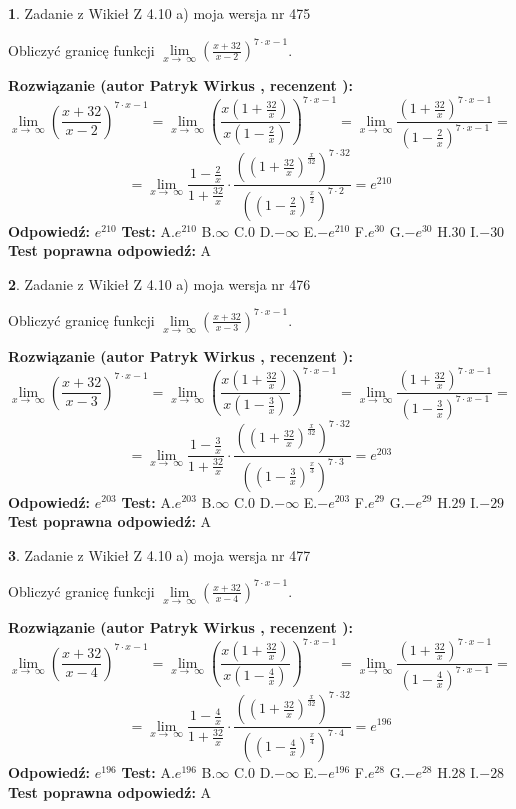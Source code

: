 \documentclass[12pt, a4paper]{article}
\theoremstyle{definition} %
\newtheorem{zad}{}
\newcommand{\zadStart}[1]{\begin{zad}#1\newline}
\newcommand{\zadStop}{\end{zad}}
\newcommand{\rozwStart}[2]{\noindent \textbf{Rozwiązanie (autor #1 , recenzent #2): }\newline}
\newcommand{\rozwStop}{\newline}
\newcommand{\odpStart}{\noindent \textbf{Odpowiedź:}\newline}
\newcommand{\odpStop}{\newline}
\newcommand{\testStart}{\noindent \textbf{Test:}\newline}
\newcommand{\testStop}{\newline}
\newcommand{\kluczStart}{\noindent \textbf{Test poprawna odpowiedź:}\newline}
\newcommand{\kluczStop}{\newline}
\begin{document}
\zadStart{Zadanie z Wikieł Z 4.10 a) moja wersja nr 475}

Obliczyć granicę funkcji  $\lim\limits_{x\to\ \infty}(\frac{x+32}{x-2})^{7\cdot x-1}$.
\zadStop
\rozwStart{Patryk Wirkus}{}
$$\lim\limits_{x\to\ \infty}(\frac{x+32}{x-2})^{7\cdot x-1} = \lim\limits_{x\to\ \infty}(\frac{x(1+\frac{32}{x})}{x(1-\frac{2}{x})})^{7\cdot x-1}=\lim\limits_{x\to\ \infty}\frac{(1+\frac{32}{x})^{7\cdot x-1}}{(1-\frac{2}{x})^{7\cdot x-1}}=$$
$$=\lim\limits_{x\to\ \infty}\frac{1-\frac{2}{x}}{1+\frac{32}{x}}\cdot\frac{((1+\frac{32}{x})^{\frac{x}{32}})^{7\cdot32}}{((1-\frac{2}{x})^{\frac{x}{2}})^{7\cdot2}}=e^{210}$$
\rozwStop
\odpStart
$e^{210}$
\odpStop
\testStart
A.$e^{210}$ B.$\infty$ C.$0$ D.$-\infty$ E.$-e^{210}$
F.$e^{30}$ G.$-e^{30}$
H.$30$
I.$-30$
\testStop
\kluczStart
A
\kluczStop



\zadStart{Zadanie z Wikieł Z 4.10 a) moja wersja nr 476}

Obliczyć granicę funkcji  $\lim\limits_{x\to\ \infty}(\frac{x+32}{x-3})^{7\cdot x-1}$.
\zadStop
\rozwStart{Patryk Wirkus}{}
$$\lim\limits_{x\to\ \infty}(\frac{x+32}{x-3})^{7\cdot x-1} = \lim\limits_{x\to\ \infty}(\frac{x(1+\frac{32}{x})}{x(1-\frac{3}{x})})^{7\cdot x-1}=\lim\limits_{x\to\ \infty}\frac{(1+\frac{32}{x})^{7\cdot x-1}}{(1-\frac{3}{x})^{7\cdot x-1}}=$$
$$=\lim\limits_{x\to\ \infty}\frac{1-\frac{3}{x}}{1+\frac{32}{x}}\cdot\frac{((1+\frac{32}{x})^{\frac{x}{32}})^{7\cdot32}}{((1-\frac{3}{x})^{\frac{x}{3}})^{7\cdot3}}=e^{203}$$
\rozwStop
\odpStart
$e^{203}$
\odpStop
\testStart
A.$e^{203}$ B.$\infty$ C.$0$ D.$-\infty$ E.$-e^{203}$
F.$e^{29}$ G.$-e^{29}$
H.$29$
I.$-29$
\testStop
\kluczStart
A
\kluczStop



\zadStart{Zadanie z Wikieł Z 4.10 a) moja wersja nr 477}

Obliczyć granicę funkcji  $\lim\limits_{x\to\ \infty}(\frac{x+32}{x-4})^{7\cdot x-1}$.
\zadStop
\rozwStart{Patryk Wirkus}{}
$$\lim\limits_{x\to\ \infty}(\frac{x+32}{x-4})^{7\cdot x-1} = \lim\limits_{x\to\ \infty}(\frac{x(1+\frac{32}{x})}{x(1-\frac{4}{x})})^{7\cdot x-1}=\lim\limits_{x\to\ \infty}\frac{(1+\frac{32}{x})^{7\cdot x-1}}{(1-\frac{4}{x})^{7\cdot x-1}}=$$
$$=\lim\limits_{x\to\ \infty}\frac{1-\frac{4}{x}}{1+\frac{32}{x}}\cdot\frac{((1+\frac{32}{x})^{\frac{x}{32}})^{7\cdot32}}{((1-\frac{4}{x})^{\frac{x}{4}})^{7\cdot4}}=e^{196}$$
\rozwStop
\odpStart
$e^{196}$
\odpStop
\testStart
A.$e^{196}$ B.$\infty$ C.$0$ D.$-\infty$ E.$-e^{196}$
F.$e^{28}$ G.$-e^{28}$
H.$28$
I.$-28$
\testStop
\kluczStart
A
\kluczStop
\end{document}
